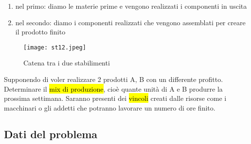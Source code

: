 \begin{enumerate}
	\item nel primo: diamo le materie prime e vengono realizzati i componenti in uscita
	\item nel secondo: diamo i componenti realizzati che vengono assemblati per creare il prodotto finito
	\end{enumerate}


\begin{figure}[H]
\centering
\texttt{[image: st12.jpeg]}
\caption{Catena tra i due stabilimenti} 
\label{st12}
\end{figure}


Supponendo di voler realizzare 2 prodotti A, B con un differente profitto. Determinare il \hl{mix di produzione}, cioè quante unità di A e B produrre la prossima settimana.
Saranno presenti dei \hl{vincoli} creati dalle risorse come i macchinari o gli addetti che potranno lavorare un numero di ore finito.


\subsection{Dati del problema}

